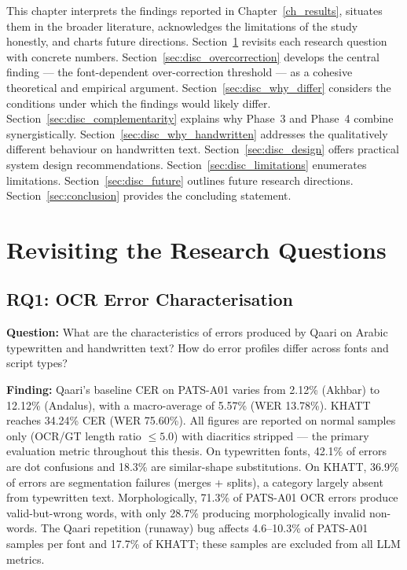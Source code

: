 
This chapter interprets the findings reported in Chapter~\ref{ch_results},
situates them in the broader literature, acknowledges the limitations of the
study honestly, and charts future directions. Section~\ref{sec:disc_rq}
revisits each research question with concrete numbers. Section~\ref{sec:disc_overcorrection}
develops the central finding --- the font-dependent over-correction threshold
--- as a cohesive theoretical and empirical argument. Section~\ref{sec:disc_why_differ}
considers the conditions under which the findings would likely differ.
Section~\ref{sec:disc_complementarity} explains why Phase~3 and Phase~4
combine synergistically. Section~\ref{sec:disc_why_handwritten} addresses
the qualitatively different behaviour on handwritten text. Section~\ref{sec:disc_design}
offers practical system design recommendations. Section~\ref{sec:disc_limitations}
enumerates limitations. Section~\ref{sec:disc_future} outlines future
research directions. Section~\ref{sec:conclusion} provides the concluding
statement.

\section{Revisiting the Research Questions}
\label{sec:disc_rq}

\subsection*{RQ1: OCR Error Characterisation}

\textbf{Question:} What are the characteristics of errors produced by Qaari
on Arabic typewritten and handwritten text? How do error profiles differ
across fonts and script types?

\textbf{Finding:} Qaari's baseline CER on PATS-A01 varies from 2.12\% (Akhbar)
to 12.12\% (Andalus), with a macro-average of 5.57\% (WER 13.78\%).
KHATT reaches 34.24\% CER (WER 75.60\%). All figures are reported on
normal samples only (OCR/GT length ratio $\leq 5.0$) with diacritics
stripped --- the primary evaluation metric throughout this thesis.
On typewritten fonts, 42.1\% of errors are dot confusions and 18.3\% are
similar-shape substitutions. On KHATT, 36.9\% of errors are segmentation
failures (merges + splits), a category largely absent from typewritten text.
Morphologically, 71.3\% of PATS-A01 OCR errors produce valid-but-wrong words,
with only 28.7\% producing morphologically invalid non-words.
The Qaari repetition (runaway) bug affects 4.6--10.3\% of PATS-A01 samples
per font and 17.7\% of KHATT; these samples are excluded from all LLM metrics.

